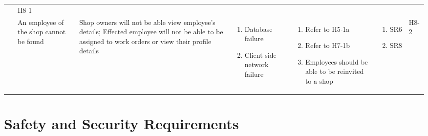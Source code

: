 \documentclass{article}
\begin{document}
\begin{landscape}
\begin{longtable}{|p{}|p{}|p{}|p{}|p{}|p{}|p{}|}
		 & H8-1                                                                                                         \\
		\cline{2-7}
		~
		 & An employee of the shop cannot be found
		 & Shop owners will not be able view employee's details; Effected employee will not be able to be
		assigned to work orders or view their profile details
		 & \begin{enumerate}[label=\alph*., leftmargin=*]
			   \item Database failure
			   \item Client-side network failure
		   \end{enumerate}
		 & \begin{enumerate}[label=\alph*., leftmargin=*]
			   \item Refer to H5-1a
			   \item Refer to H7-1b
			   \item Employees should be able to be reinvited to a shop
		   \end{enumerate}
		 & \begin{enumerate}[label=\alph*., leftmargin=*]
			   \item SR6
			   \item SR8
		   \end{enumerate}
		 & H8-2                                                                                                         \\
		\hline
	\end{longtable}
\end{landscape}

\section{Safety and Security Requirements}
\end{document}
